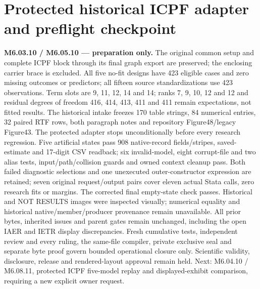 \documentclass[11pt,a4paper]{article}
\begin{document}
\section*{Protected historical ICPF adapter and preflight checkpoint}
\noindent\textbf{M6.03.10 / M6.05.10 — preparation only.}
The original common setup and complete ICPF block through its final graph export
are preserved; the enclosing carrier brace is excluded.
All five no-fit designs have 423 eligible cases and zero missing outcomes or
predictors; all fifteen source standardizations use 423 observations.
Term slots are 9, 11, 12, 14 and 14; ranks 7, 9, 10, 12 and 12 and residual degrees
of freedom 416, 414, 413, 411 and 411 remain expectations, not fitted results.
The historical intake freezes 170 table strings, 84 numerical entries, 32 paired
RTF rows, both paragraph notes and repository Figure48/legacy Figure43.
The protected adapter stops unconditionally before every research regression.
Five artificial states pass 908 native-record fields/stripes, saved-estimate and
17-digit CSV readback; six invalid-model, eight corrupt-file and two alias tests,
input/path/collision guards and owned context cleanup pass.
Both failed diagnostic selections and one unexecuted outer-constructor expression
are retained; seven original request/output pairs cover eleven actual Stata calls,
zero research fits or margins. The corrected final empty-state check passes.
Historical and NOT RESULTS images were inspected visually; numerical equality
and historical native/member/producer provenance remain unavailable.
All prior bytes, inherited issues and parent gates remain unchanged, including
the open IAER and IETR display discrepancies. Fresh cumulative tests, independent
review and every ruling, the same-file compiler, private exclusive seal and
separate byte proof govern bounded operational closure only.
Scientific validity, disclosure, release and rendered-layout approval remain held.
Next: M6.04.10 / M6.08.11, protected ICPF five-model replay and displayed-exhibit
comparison, requiring a new explicit owner request.
\end{document}
